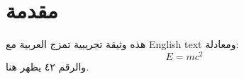 \documentclass{article}
\begin{document}
\section{مقدمة}
هذه وثيقة تجريبية تمزج العربية مع \textenglish{English text} ومعادلة:
\begin{equation}
  E = mc^2
\end{equation}
والرقم ٤٢ يظهر هنا.
\end{document}
